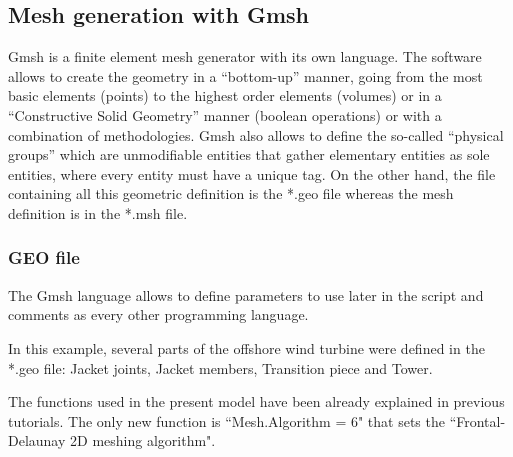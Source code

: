 \documentclass[a4]{article}
\begin{document}
\subsection{Mesh generation with Gmsh}
Gmsh \cite{gmsh, gmshweb} is a finite element mesh generator with its own language. The software allows to create the geometry in a “bottom-up” manner, going from the most basic elements (points) to the highest order elements (volumes) or in a “Constructive Solid Geometry” manner (boolean operations) or with a combination of methodologies. Gmsh also allows to define  the so-called “physical groups” which are unmodifiable entities that gather elementary entities as sole entities, where every entity must have a unique tag. On the other hand, the file containing all this geometric definition is the *.geo file whereas the mesh definition is in the *.msh file. 

\subsubsection{GEO file}
The Gmsh language allows to define parameters to use later in the script and comments as every other programming language. 

In this example, several parts of the offshore wind turbine were defined in the *.geo file: Jacket joints, Jacket members, Transition piece and Tower.  

The functions used in the present model have been already explained in previous tutorials. The only new function is ``Mesh.Algorithm = 6" that sets the ``Frontal-Delaunay 2D meshing algorithm".
\end{document}
